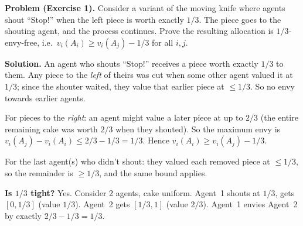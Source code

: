 \begin{exbox}
\textbf{Problem (Exercise 1).} Consider a variant of the moving knife where agents shout ``Stop!'' when the left piece is worth exactly $1/3$. The piece goes to the shouting agent, and the process continues. Prove the resulting allocation is $1/3$-envy-free, i.e.\ $v_i(A_i) \ge v_i(A_j) - 1/3$ for all $i, j$.

\textbf{Solution.}
An agent who shouts ``Stop!'' receives a piece worth exactly $1/3$ to them. Any piece to the \emph{left} of theirs was cut when some other agent valued it at $1/3$; since the shouter waited, they value that earlier piece at $\le 1/3$. So no envy towards earlier agents.

For pieces to the \emph{right}: an agent might value a later piece at up to $2/3$ (the entire remaining cake was worth $2/3$ when they shouted). So the maximum envy is $v_i(A_j) - v_i(A_i) \le 2/3 - 1/3 = 1/3$. Hence $v_i(A_i) \ge v_i(A_j) - 1/3$.

For the last agent(s) who didn't shout: they valued each removed piece at $\le 1/3$, so the remainder is $\ge 1/3$, and the same bound applies.

\textbf{Is $1/3$ tight?} Yes. Consider 2 agents, cake uniform. Agent~1 shouts at $1/3$, gets $[0, 1/3]$ (value $1/3$). Agent~2 gets $[1/3, 1]$ (value $2/3$). Agent~1 envies Agent~2 by exactly $2/3 - 1/3 = 1/3$.
\end{exbox}

\separator

